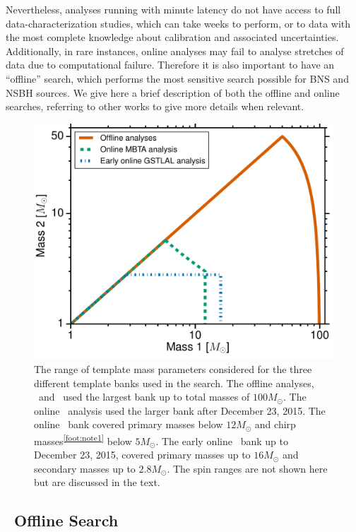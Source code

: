 Nevertheless, analyses running with minute latency do not have access to full
data-characterization studies, which can take weeks to perform, or to data with the most complete
knowledge about calibration and associated uncertainties. Additionally, in rare
instances, online analyses may fail to analyse stretches of data due to computational failure. Therefore it is also
important to have an ``offline'' search, which performs the most sensitive search possible
for \ac{BNS} and \ac{NSBH} sources.
We give here a brief description
of both the offline and online searches, referring to other works to give more details
when relevant.

\begin{figure}[t]
\centering
\includegraphics[width=\textwidth]{figs/chapter3/figure1}
\caption{\label{fig:banks}The range of template mass parameters considered for the
three different template banks used in the search.
The offline analyses, \pycbc\ and \gstlal\, used the largest
bank up to total masses of $100 M_{\odot}$. The online \gstlal\ analysis
used the larger bank after December 23, 2015.
The online \mbta\ bank covered primary masses below $12 M_{\odot}$
and chirp masses\textsuperscript{\ref{foot:note1}} below
$5 M_{\odot}$. The early online \gstlal\ bank up to December 23, 2015, covered primary
masses up to $16 M_{\odot}$ and secondary masses up to $2.8 M_{\odot}$.
The spin ranges are not shown here but are discussed in the text. }
\end{figure}

  \subsection{\pycbc{}\ Offline Search}
  \label{ssec:offline_searches}
  

